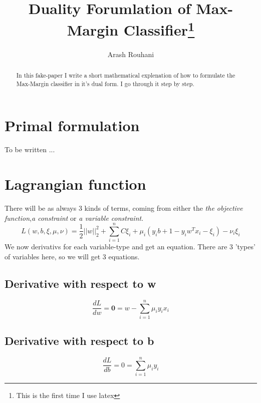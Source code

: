 \documentclass[a4paper,11pt]{article}
\title{Duality Forumlation of Max-Margin Classifier\footnote{This is the first time I use latex}}
\author{Arash Rouhani}
\begin{document}
\maketitle

\begin{abstract}
In this fake-paper I write a short mathematical explenation
of how to formulate the Max-Margin classifier in it's dual form.
I go through it step by step. 

\end{abstract}

\section{Primal formulation}
To be written ...
\section{Lagrangian function}
There will be as always 3 kinds of terms, coming from either the \textit{the objective function},\textit{a constraint} or \textit{a variable constraint}.
\begin{equation}
L(w, b, \xi, \mu, \nu) = \frac{1}{2} ||w||^2_2 + \sum\limits_{i=1}^n {C\xi_i + \mu_i(y_ib + 1 - y_iw^Tx_i - \xi_i) - \nu_i\xi_i}
\end{equation}
We now derivativs for each variable-type and get an equation. There are 3 'types' of variables here, so we will get 3 equations.

\subsection{Derivative with respect to w}
  \begin{equation}
    \frac{dL}{dw} = \textbf{0} = w - \sum\limits_{i=1}^n {\mu_i y_i x_i}
  \end{equation}
\subsection{Derivative with respect to b}
  \begin{equation}
    \frac{dL}{db} = 0 = \sum\limits_{i=1}^n {\mu_i y_i}
  \end{equation}
\end{document}
